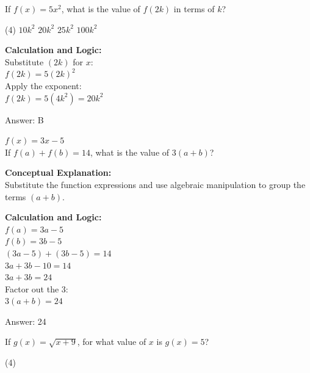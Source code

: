 \documentclass[11pt,paper=a4,answers]{exam}
\begin{document}
\begin{questions}
\question
If $f(x) = 5x^2$, what is the value of $f(2k)$ in terms of $k$?
\begin{tasks}(4)
    \task $10k^2$
    \task $20k^2$
    \task $25k^2$
    \task $100k^2$
\end{tasks}

\begin{solution}
\textbf{Calculation and Logic:} \\
Substitute $(2k)$ for $x$: \\
$f(2k) = 5(2k)^2$ \\
Apply the exponent: \\
$f(2k) = 5(4k^2) = 20k^2$

\vspace{25pt}

Answer: \colorbox{yellow!100}{B}
\end{solution}

\vspace{40pt}

\question
$f(x) = 3x - 5$ \\
If $f(a) + f(b) = 14$, what is the value of $3(a+b)$?

\begin{solution}
\textbf{Conceptual Explanation:} \\
Substitute the function expressions and use algebraic manipulation to group the terms $(a+b)$.

\vspace{20pt}

\textbf{Calculation and Logic:} \\
$f(a) = 3a - 5$ \\
$f(b) = 3b - 5$ \\
$(3a - 5) + (3b - 5) = 14$ \\
$3a + 3b - 10 = 14$ \\
$3a + 3b = 24$ \\
Factor out the 3: \\
$3(a + b) = 24$

\vspace{25pt}

Answer: \colorbox{yellow!100}{24}
\end{solution}

\vspace{40pt}

\question
If $g(x) = \sqrt{x+9}$, for what value of $x$ is $g(x) = 5$?
\begin{tasks}(4)
\end{tasks}


\end{questions}
\end{document}

